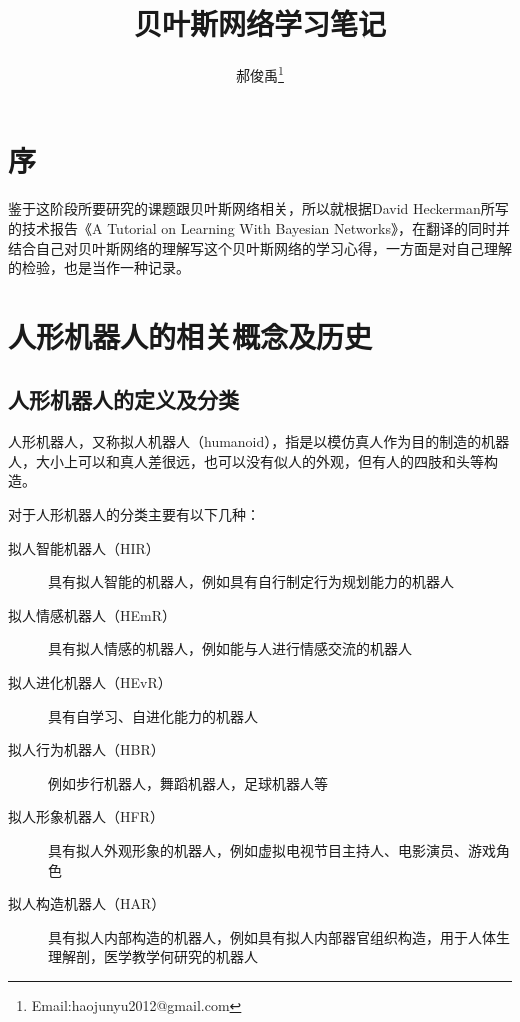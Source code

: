 \documentclass[10pt,a4paper]{article}
\begin{document}
\begin{CJK*}{UTF8}{gkai}
\title{贝叶斯网络学习笔记}					   							%
\author{郝俊禹\thanks{Email:haojunyu2012@gmail.com}}				%
\date{}                                             				%
\maketitle                                          				%
\tableofcontents 												%
\clearpage


\section{序}
鉴于这阶段所要研究的课题跟贝叶斯网络相关，所以就根据David Heckerman所写的技术报告《A Tutorial on Learning With Bayesian Networks》，在翻译的同时并结合自己对贝叶斯网络的理解写这个贝叶斯网络的学习心得，一方面是对自己理解的检验，也是当作一种记录。





\section{人形机器人的相关概念及历史}
\subsection{人形机器人的定义及分类}
人形机器人，又称拟人机器人（humanoid），指是以模仿真人作为目的制造的机器人，大小上可以和真人差很远，也可以没有似人的外观，但有人的四肢和头等构造。\cite{1}

对于人形机器人的分类主要有以下几种\cite{2}：
\begin{description}
\item[拟人智能机器人（HIR）] 具有拟人智能的机器人，例如具有自行制定行为规划能力的机器人
\item[拟人情感机器人（HEmR）] 具有拟人情感的机器人，例如能与人进行情感交流的机器人
\item[拟人进化机器人（HEvR）] 具有自学习、自进化能力的机器人
\item[拟人行为机器人（HBR）] 例如步行机器人，舞蹈机器人，足球机器人等
\item[拟人形象机器人（HFR）] 具有拟人外观形象的机器人，例如虚拟电视节目主持人、电影演员、游戏角色
\item[拟人构造机器人（HAR）] 具有拟人内部构造的机器人，例如具有拟人内部器官组织构造，用于人体生理解剖，医学教学何研究的机器人
\end{description}



\end{CJK*}
\end{document}
